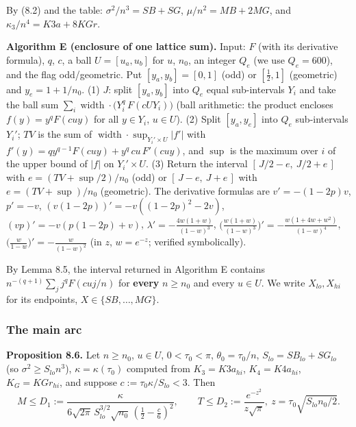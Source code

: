 By (8.2) and the table: \(\sigma^2/n^3=SB+SG\), \(\mu/n^2=MB+2MG\), and \(\kappa_3/n^4=K3a+8KGr\).

\textbf{Algorithm E (enclosure of one lattice sum).} Input: \(F\) (with its derivative formula), \(q\), \(c\), a ball \(U=[u_a,u_b]\) for \(u\), \(n_0\), an integer \(Q_e\) (we use \(Q_e=600\)), and the flag odd/geometric. Put \([y_a,y_b]=[0,1]\) (odd) or \([\frac12,1]\) (geometric) and \(y_e=1+1/n_0\). (1) \(J\): split \([y_a,y_b]\) into \(Q_e\) equal sub-intervals \(Y_i\) and take the ball sum \(\sum_i\operatorname{width}\cdot\bigl(Y_i^q\,F(cUY_i)\bigr)\) (ball arithmetic: the product encloses \(f(y)=y^qF(cuy)\) for all \(y\in Y_i\), \(u\in U\)). (2) Split \([y_a,y_e]\) into \(Q_e\) sub-intervals \(Y_i'\); \(TV\) is the sum of \(\operatorname{width}\cdot\sup_{Y_i'\times U}|f'|\) with \(f'(y)=qy^{q-1}F(cuy)+y^q\,cu\,F'(cuy)\), and \(\sup\) is the maximum over \(i\) of the upper bound of \(|f|\) on \(Y_i'\times U\). (3) Return the interval \([\,J/2-e,\ J/2+e\,]\) with \(e=(TV+\sup/2)/n_0\) (odd) or \([\,J-e,\ J+e\,]\) with \(e=(TV+\sup)/n_0\) (geometric). The derivative formulas are \(v'=-(1-2p)v\), \(p'=-v\), \((v(1-2p))'=-v((1-2p)^2-2v)\), \((vp)'=-v(p(1-2p)+v)\), \(\lambda'=-\frac{4w(1+w)}{(1-w)^3}\), \(\bigl(\frac{w(1+w)}{(1-w)^3}\bigr)'=-\frac{w(1+4w+w^2)}{(1-w)^4}\), \(\bigl(\frac w{1-w}\bigr)'=-\frac w{(1-w)^2}\) (in \(z\), \(w=e^{-z}\); verified symbolically).

By Lemma 8.5, the interval returned in Algorithm E contains \(n^{-(q+1)}\sum_jj^qF(cuj/n)\) for \textbf{every} \(n\ge n_0\) and every \(u\in U\). We write \(X_{lo},X_{hi}\) for its endpoints, \(X\in\{SB,\dots,MG\}\).

\subsubsection{The main arc}\label{the-main-arc}

\textbf{Proposition 8.6.} Let \(n\ge n_0\), \(u\in U\), \(0<\tau_0<\pi\), \(\theta_0=\tau_0/n\), \(S_{lo}=SB_{lo}+SG_{lo}\) (so \(\sigma^2\ge S_{lo}n^3\)), \(\kappa=\kappa(\tau_0)\) computed from \(K_3=K3a_{hi}\), \(K_4=K4a_{hi}\), \(K_G=KGr_{hi}\), and suppose \(c:=\tau_0\kappa/S_{lo}<3\). Then
\[M\le D_1:=\frac{\kappa}{6\sqrt{2\pi}\,S_{lo}^{3/2}\sqrt{n_0}\,(\frac12-\frac c6)^2},\qquad T\le D_2:=\frac{e^{-z^2}}{z\sqrt\pi},\ z=\tau_0\sqrt{S_{lo}n_0/2}.\]

